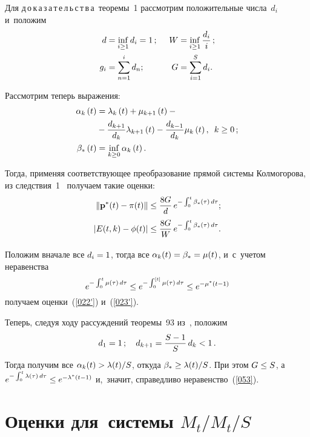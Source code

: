 \begin{multicols}{2}
\smallskip

Для д\,о\,к\,а\,з\,а\,т\,е\,л\,ь\,с\,т\,в\,а\
 теоремы~1 рассмотрим положительные числа~$d_i$ и~положим
\begin{alignat*}{2}
d&=\mathop{\mathrm{inf}}\limits_{i \ge 1} d_i = 1\,; &\enskip W&=\inf_{i \ge 1} \fr {d_i}{i}\,;\\
\displaystyle g_i&=\sum\limits_{n=1}^i d_n; &\enskip 
\displaystyle G &= \sum\limits_{i=1}^Sd_i.
\end{alignat*}

Рассмотрим теперь выражения:
\begin{align}
\alpha_{k}\left( t\right) &= \lambda _k\left( t\right) +\mu
_{k+1}\left( t\right) -{}\notag\\
&{}- \fr{d_{k+1}}{d_k} \lambda _{k+1}\left(t\right) -
\fr{d_{k-1}}{d_k} \mu _k\left( t\right),
\enskip k \ge 0\,; \notag %
\\
\beta_*\left( t\right) &= \inf_{k\geq 0} \alpha_{k}\left( t\right).
\label{212}
\end{align}

Тогда, применяя соответствующее преобразование прямой системы
Колмогорова, из следствия~1~\cite{zAT} получаем такие оценки:
\begin{align*}
\|{\bf p}^*(t) - {\bf \pi}(t)\| &\le \displaystyle\frac{\displaystyle 8G\mathstrut}{\displaystyle d\mathstrut}\,
e^{-\int_0^t\beta_*(\tau)\,d\tau};
\\
|E(t,k) - \phi (t)| & \le  \displaystyle\frac{\displaystyle 8G\mathstrut}{\displaystyle W\mathstrut}\,
e^{-\int_0^t\beta_*(\tau)\,d\tau}.
\end{align*}


Положим вначале все $d_i\hm=1$, тогда все
$\alpha_{k}(t)\hm=\beta_*\hm=\mu(t)$, и~с~учетом неравенства
$$
e^{-\int\nolimits_0^t\mu(\tau)\,d\tau}\hm \le e^{-\int_0^{[t]}\mu(\tau)\,d\tau}
\le e^{-\mu^*(t-1)}
$$ 
получаем оценки~(\ref{022'}) и~(\ref{023'}).


Теперь, следуя ходу рассуждений теоремы~93 из~\cite{zbs}, положим
$$
d_1=1\,;\quad d_{k+1}=\displaystyle\frac{\displaystyle S-1\mathstrut}{\displaystyle S\mathstrut}\,d_k <1\,.
$$ 
Тогда получим все
$\alpha_{k}(t) \hm> {\la(t)}/{S}$, откуда $\beta_* \hm\ge
{\la(t)}/{S}$. При этом  $G \hm\le S$, а~$e^{-\int_0^t\la(\tau)\,d\tau} \hm\le 
e^{-\la^*(t-1)}$ и,~значит,
справедливо неравенство~(\ref{053}).

\section{Оценки для~системы $M_t/M_t/S$}


\end{multicols}
